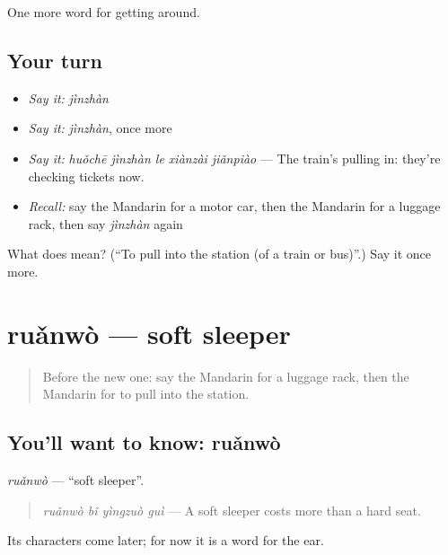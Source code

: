 \begin{grammarlens}[title={What you've built}]
One more word for getting around.
\end{grammarlens}

\subsection*{Your turn}
\begin{itemize}
\raggedright
  \item \emph{Say it:} \emph{jìnzhàn}
  \item \emph{Say it:} \emph{jìnzhàn}, once more
  \item \emph{Say it:} \emph{huǒchē jìnzhàn le xiànzài jiǎnpiào} — The train's pulling in: they're checking tickets now.
  \item \emph{Recall:} say the Mandarin for a motor car, then the Mandarin for a luggage rack, then say \emph{jìnzhàn} again
\end{itemize}

\begin{tcolorbox}[breakable,colback=teal!4,colframe=teal!35!black,title={Before you move on}]
What does  mean? (\textquotedblleft{}To pull into the station (of a train or bus)\textquotedblright{}.) Say it once more.
\end{tcolorbox}
\section[ruǎnwò]{ruǎnwò — soft sleeper}

\label{lesson:ZH-C407-ruanwo}



\begin{quote}
Before the new one: say the Mandarin for a luggage rack, then the Mandarin for to pull into the station.
\end{quote}

\subsection*{You'll want to know: ruǎnwò}
\emph{ruǎnwò} — \textquotedblleft{}soft sleeper\textquotedblright{}.

\begin{quote}
\emph{ruǎnwò bǐ yìngzuò guì} — A soft sleeper costs more than a hard seat.
\end{quote}

Its characters come later; for now it is a word for the ear.

